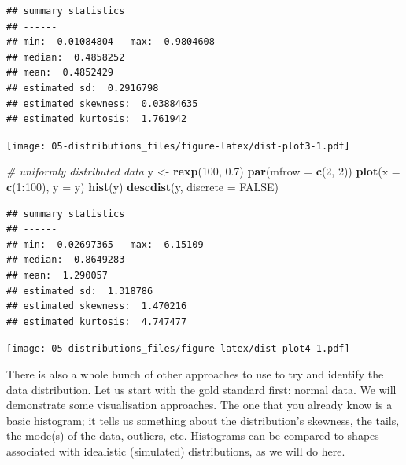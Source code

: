 \documentclass[english,10pt,a4paper,oneside]{book}
\newenvironment{Shaded}{\begin{snugshade}}{\end{snugshade}}
\newcommand{\KeywordTok}[1]{\textcolor[rgb]{0.13,0.29,0.53}{\textbf{#1}}}
\newcommand{\DataTypeTok}[1]{\textcolor[rgb]{0.13,0.29,0.53}{#1}}
\newcommand{\DecValTok}[1]{\textcolor[rgb]{0.00,0.00,0.81}{#1}}
\newcommand{\FloatTok}[1]{\textcolor[rgb]{0.00,0.00,0.81}{#1}}
\newcommand{\StringTok}[1]{\textcolor[rgb]{0.31,0.60,0.02}{#1}}
\newcommand{\CommentTok}[1]{\textcolor[rgb]{0.56,0.35,0.01}{\textit{#1}}}
\newcommand{\OtherTok}[1]{\textcolor[rgb]{0.56,0.35,0.01}{#1}}
\newcommand{\OperatorTok}[1]{\textcolor[rgb]{0.81,0.36,0.00}{\textbf{#1}}}
\newcommand{\NormalTok}[1]{#1}
\theoremstyle{definition}
\theoremstyle{definition}
\theoremstyle{definition}
\theoremstyle{remark}
\begin{document}
\begin{verbatim}
## summary statistics
## ------
## min:  0.01084804   max:  0.9804608 
## median:  0.4858252 
## mean:  0.4852429 
## estimated sd:  0.2916798 
## estimated skewness:  0.03884635 
## estimated kurtosis:  1.761942
\end{verbatim}

\texttt{[image: 05-distributions\_files/figure-latex/dist-plot3-1.pdf]}

\begin{Shaded}
\begin{Highlighting}[]
\CommentTok{# uniformly distributed data}
\NormalTok{y <-}\StringTok{ }\KeywordTok{rexp}\NormalTok{(}\DecValTok{100}\NormalTok{, }\FloatTok{0.7}\NormalTok{)}
\KeywordTok{par}\NormalTok{(}\DataTypeTok{mfrow =} \KeywordTok{c}\NormalTok{(}\DecValTok{2}\NormalTok{, }\DecValTok{2}\NormalTok{))}
\KeywordTok{plot}\NormalTok{(}\DataTypeTok{x =} \KeywordTok{c}\NormalTok{(}\DecValTok{1}\OperatorTok{:}\DecValTok{100}\NormalTok{), }\DataTypeTok{y =}\NormalTok{ y)}
\KeywordTok{hist}\NormalTok{(y)}
\KeywordTok{descdist}\NormalTok{(y, }\DataTypeTok{discrete =} \OtherTok{FALSE}\NormalTok{)}
\end{Highlighting}
\end{Shaded}

\begin{verbatim}
## summary statistics
## ------
## min:  0.02697365   max:  6.15109 
## median:  0.8649283 
## mean:  1.290057 
## estimated sd:  1.318786 
## estimated skewness:  1.470216 
## estimated kurtosis:  4.747477
\end{verbatim}

\texttt{[image: 05-distributions\_files/figure-latex/dist-plot4-1.pdf]}

There is also a whole bunch of other approaches to use to try and
identify the data distribution. Let us start with the gold standard
first: normal data. We will demonstrate some visualisation approaches.
The one that you already know is a basic histogram; it tells us
something about the distribution's skewness, the tails, the mode(s) of
the data, outliers, etc. Histograms can be compared to shapes associated
with idealistic (simulated) distributions, as we will do here.
\end{document}
